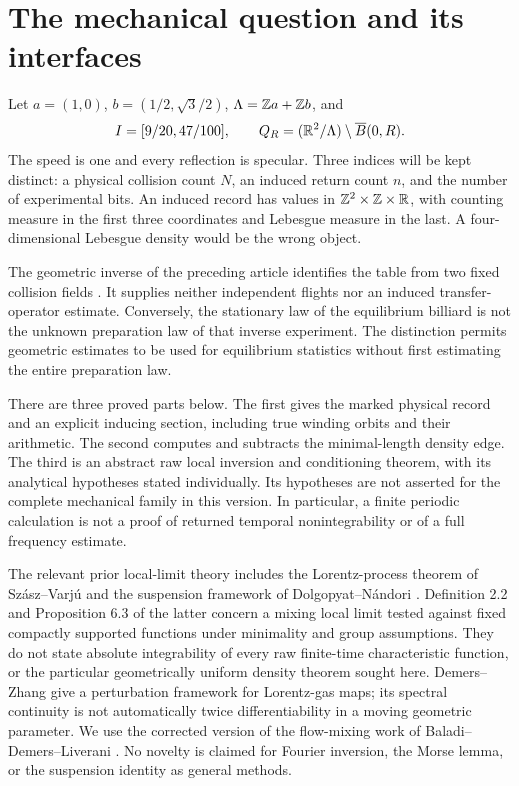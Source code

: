 \section{The mechanical question and its interfaces}
Let $a=(1,0)$, $b=(1/2,\sqrt3/2)$, $\Lambda=\mathbb Z a+\mathbb Z b$, and
\[
 I=[9/20,47/100],\qquad Q_R=(\mathbb R^2/\Lambda)\setminus\overline B(0,R).
\]
The speed is one and every reflection is specular. Three indices will be kept distinct: a physical collision count $N$, an induced return count $n$, and the number of experimental bits. An induced record has values in $\mathbb Z^2\times\mathbb Z\times\mathbb R$, with counting measure in the first three coordinates and Lebesgue measure in the last. A four-dimensional Lebesgue density would be the wrong object.

The geometric inverse of the preceding article identifies the table from two fixed collision fields \cite{A2G}. It supplies neither independent flights nor an induced transfer-operator estimate. Conversely, the stationary law of the equilibrium billiard is not the unknown preparation law of that inverse experiment. The distinction permits geometric estimates to be used for equilibrium statistics without first estimating the entire preparation law.

There are three proved parts below. The first gives the marked physical record and an explicit inducing section, including true winding orbits and their arithmetic. The second computes and subtracts the minimal-length density edge. The third is an abstract raw local inversion and conditioning theorem, with its analytical hypotheses stated individually. Its hypotheses are not asserted for the complete mechanical family in this version. In particular, a finite periodic calculation is not a proof of returned temporal nonintegrability or of a full frequency estimate.

The relevant prior local-limit theory includes the Lorentz-process theorem of Sz\'asz--Varj\'u \cite{SV} and the suspension framework of Dolgopyat--N\'andori \cite{DN}. Definition 2.2 and Proposition 6.3 of the latter concern a mixing local limit tested against fixed compactly supported functions under minimality and group assumptions. They do not state absolute integrability of every raw finite-time characteristic function, or the particular geometrically uniform density theorem sought here. Demers--Zhang \cite{DZ} give a perturbation framework for Lorentz-gas maps; its spectral continuity is not automatically twice differentiability in a moving geometric parameter. We use the corrected version of the flow-mixing work of Baladi--Demers--Liverani \cite{BDL}. No novelty is claimed for Fourier inversion, the Morse lemma, or the suspension identity as general methods.


